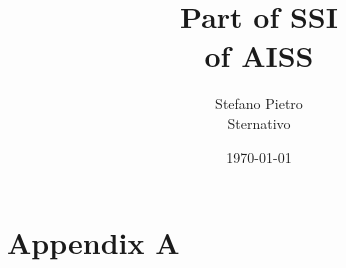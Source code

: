 \documentclass[a4paper,12pt]{article} %
\title{Part of SSI \\of AISS}
\author{Stefano Pietro \\ Sternativo}
\date{\today}
\begin{document}
\maketitlecustom %

\tableofcontents %
\newpage

\def\slides{slides/sample-2.pdf}


\def\slides{slides/sample-2.pdf}


\def\slides{slides/sample-2.pdf}









\appendix
\section{Appendix A}
\end{document}
